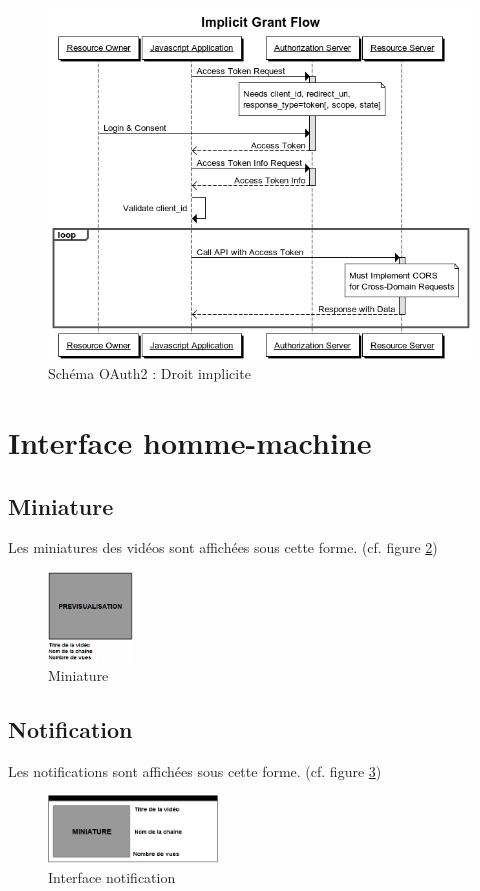 \documentclass[11pt]{report} %
\begin{document}
			\begin{figure}[h]
				\center
				\includegraphics[width=1\textwidth]{../img/SchemaOAuth2.png}
				\caption{Schéma OAuth2 : Droit implicite}
				\label{oauth2}
			\end{figure}
			
			\newpage
	
	\section{Interface homme-machine}
		\subsection{Miniature}
		Les miniatures des vidéos sont affichées sous cette forme. (cf. figure \ref{Miniature})
		\begin{figure}[h]
			\center
			\includegraphics[width=0.2\textwidth]{../img/Miniature.png}
			\caption{Miniature}
			\label{Miniature}
		\end{figure}
		
		\subsection{Notification}
		Les notifications sont affichées sous cette forme. (cf. figure \ref{notification})
		\begin{figure}[h]
			\center
			\includegraphics[width=0.4\textwidth]{../img/NotificationInterface.png}
			\caption{Interface notification}
			\label{notification}
		\end{figure}
		
\end{document}
